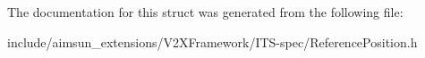 The documentation for this struct was generated from the following file\+:\begin{DoxyCompactItemize}
\item 
include/aimsun\+\_\+extensions/\+V2\+X\+Framework/\+I\+T\+S-\/spec/Reference\+Position.\+h\end{DoxyCompactItemize}

